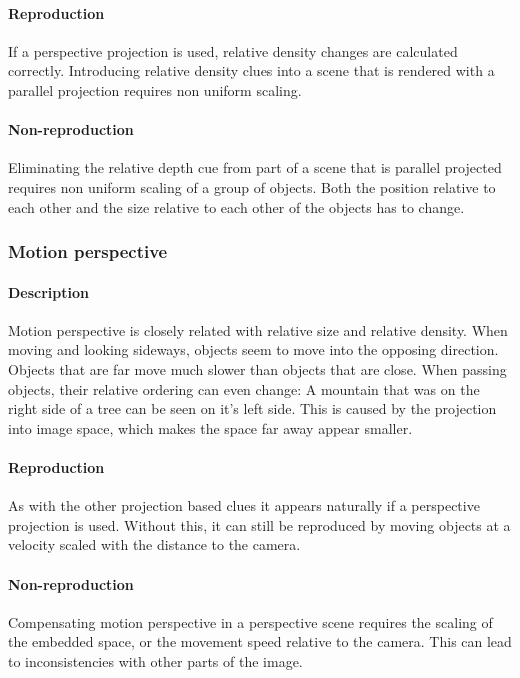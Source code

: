\paragraph{Reproduction}
If a perspective projection is used, relative density changes are calculated correctly. Introducing relative density clues into a scene that is rendered with a parallel projection requires non uniform scaling.

\paragraph{Non-reproduction}
Eliminating the relative depth cue from part of a scene that is parallel projected requires non uniform scaling of a group of objects.
Both the position relative to each other and the size relative to each other of the objects has to change.


\subsubsection{Motion perspective}
\paragraph{Description}
Motion perspective is closely related with relative size and relative density.
When moving and looking sideways, objects seem to move into the opposing direction.
Objects that are far move much slower than objects that are close.
When passing objects, their relative ordering can even change: A mountain that was on the right side of a tree can be seen on it's left side.
This is caused by the projection into image space, which makes the space far away appear smaller.

\paragraph{Reproduction}
As with the other projection based clues it appears naturally if a perspective projection is used. Without this, it can still be reproduced by moving objects at a velocity scaled with the distance to the camera.

\paragraph{Non-reproduction}
Compensating motion perspective in a perspective scene requires the scaling of the embedded space, or the movement speed relative to the camera. This can lead to inconsistencies with other parts of the image.


